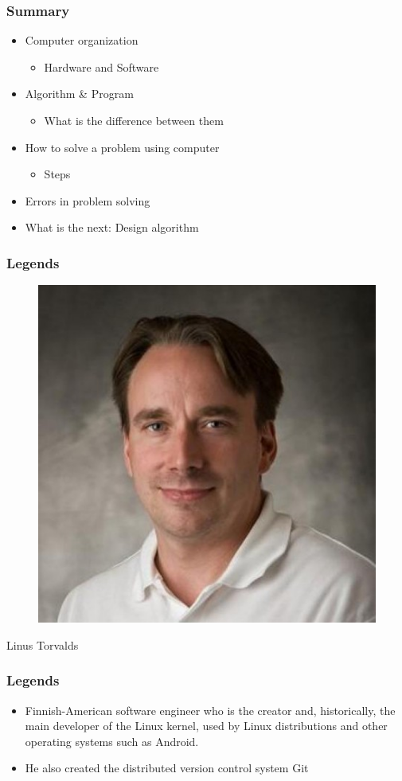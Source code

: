 \documentclass{../c-lecture}
\begin{document}
\begin{frame}
  \frametitle{Summary}
  \begin{itemize}
    \item Computer organization
    \begin{itemize}
      \item Hardware and Software
    \end{itemize}
    \pause%
    \item Algorithm \& Program
    \begin{itemize}
      \item What is the difference between them
    \end{itemize}
    \pause%
    \item How to solve a problem using computer
    \begin{itemize}
      \item Steps
    \end{itemize}
    \pause%
    \item Errors in problem solving
    \item What is the next: Design algorithm
  \end{itemize}
\end{frame}

\begin{frame}
  \frametitle{Legends}
  \begin{figure}
    \includegraphics[height=.75\textheight]{./img/torvalds.png}
  \end{figure}
  \pause%
  \centering
  \color{Violet} Linus Torvalds
\end{frame}

\begin{frame}
  \frametitle{Legends}
  \begin{itemize}
    \item Finnish-American software engineer who is the creator and, historically, the main developer of the Linux kernel,
      used by Linux distributions and other operating systems such as Android.
    \item He also created the distributed version control system Git
  \end{itemize}
\end{frame}
\end{document}
